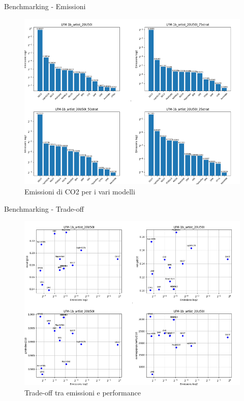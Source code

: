 \begin{frame}{Benchmarking - Emissioni}
    \begin{figure}[H]
    \centering
    \includegraphics[width=\linewidth,height=0.7\textheight,keepaspectratio]{images/EmissioniLFM.png}
    \caption{Emissioni di CO2 per i vari modelli}
    \end{figure}
\end{frame}

\begin{frame}{Benchmarking - Trade-off}
    \begin{figure}[H]
    \centering
    \includegraphics[width=\linewidth,height=0.7\textheight,keepaspectratio]{images/TradeOff.png}
    \caption{Trade-off tra emissioni e performance}
    \end{figure}
\end{frame}
